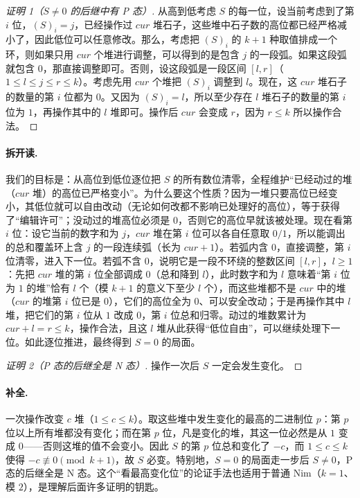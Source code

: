 \documentclass[UTF8,a4paper,11pt,oneside,openany,fontset=fandol]{ctexbook}
\theoremstyle{definition}
\begin{document}
\begin{proof}[证明 1（$S\ne0$ 的后继中有 P 态）]
从高到低考虑 $S$ 的每一位，设当前考虑到了第 $i$ 位，$(S)_i=j$，已经操作过 $cur$ 堆石子，这些堆中石子数的高位都已经严格减小了，因此低位可以任意修改。那么，考虑把 $(S)_i$ 的 $k+1$ 种取值排成一个环，则如果只用 $cur$ 个堆进行调整，可以得到的是包含 $j$ 的一段弧。如果这段弧就包含 $0$，那直接调整即可。否则，设这段弧是一段区间 $[l,r]$（$1\le l\le j\le r\le k$）。考虑先用 $cur$ 个堆把 $(S)_i$ 调整到 $l$。现在，这 $cur$ 堆石子的数量的第 $i$ 位都为 $0$。又因为 $(S)_i=l$，所以至少存在 $l$ 堆石子的数量的第 $i$ 位为 $1$，再操作其中的 $l$ 堆即可。操作后 $cur$ 会变成 $r$，因为 $r\le k$ 所以操作合法。
\end{proof}

\paragraph{拆开读.} 我们的目标是：从高位到低位逐位把 $S$ 的所有数位清零，全程维护“已经动过的堆（$cur$ 堆）的高位已严格变小”。为什么要这个性质？因为一堆只要高位已经变小，其低位就可以自由改动（无论如何改都不影响已处理好的高位），等于获得了“编辑许可”；没动过的堆高位必须是 $0$，否则它的高位早就该被处理。现在看第 $i$ 位：设它当前的数字和为 $j$，$cur$ 堆在第 $i$ 位可以各自任意取 $0/1$，所以能调出的总和覆盖环上含 $j$ 的一段连续弧（长为 $cur+1$）。若弧内含 $0$，直接调整，第 $i$ 位清零，进入下一位。若弧不含 $0$，说明它是一段不环绕的整数区间 $[l,r]$，$l\ge1$：先把 $cur$ 堆的第 $i$ 位全部调成 $0$（总和降到 $l$），此时数字和为 $l$ 意味着“第 $i$ 位为 $1$ 的堆”恰有 $l$ 个（模 $k+1$ 的意义下至少 $l$ 个），而这些堆都不是 $cur$ 中的堆（$cur$ 的堆第 $i$ 位已是 $0$），它们的高位全为 $0$、可以安全改动；于是再操作其中 $l$ 堆，把它们的第 $i$ 位从 $1$ 改成 $0$，第 $i$ 位总和归零。动过的堆数累计为 $cur+l=r\le k$，操作合法，且这 $l$ 堆从此获得“低位自由”，可以继续处理下一位。如此逐位推进，最终得到 $S=0$ 的局面。

\begin{proof}[证明 2（P 态的后继全是 N 态）]
操作一次后 $S$ 一定会发生变化。
\end{proof}
\paragraph{补全.} 一次操作改变 $c$ 堆（$1\le c\le k$）。取这些堆中发生变化的最高的二进制位 $p$：第 $p$ 位以上所有堆都没有变化；而在第 $p$ 位，凡是变化的堆，其这一位必然是从 $1$ 变成 $0$——否则这堆的值不会变小。因此 $S$ 的第 $p$ 位总和变化了 $-c$，而 $1\le c\le k$ 使得 $-c\not\equiv0\pmod{k+1}$，故 $S$ 必变。特别地，$S=0$ 的局面走一步后 $S\ne0$，P 态的后继全是 N 态。这个“看最高变化位”的论证手法也适用于普通 Nim（$k=1$、模 $2$），是理解后面许多证明的钥匙。
\end{document}
